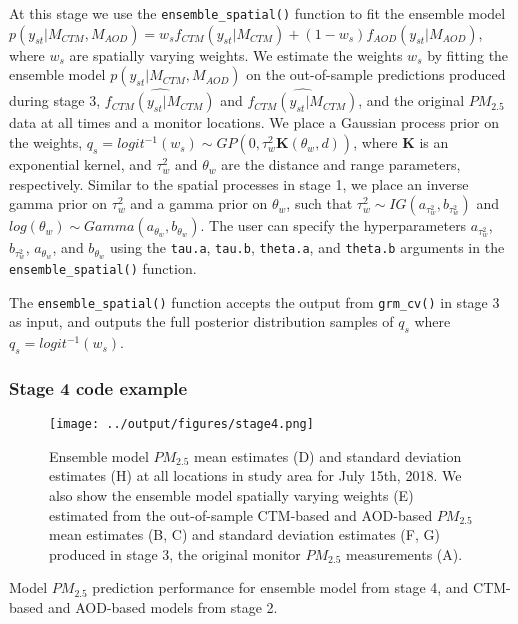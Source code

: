 \documentclass[12pt]{article}
\newcommand{\bl}{\mathbf}
\begin{document}
At this stage we use the \texttt{ensemble\_spatial()} function to fit the ensemble model  $p(y_{st} | M_{CTM}, M_{AOD}) = w_s f_{CTM}(y_{st} | M_{CTM}) + (1-w_s) f_{AOD}(y_{st}|M_{AOD})$, where $w_s$ are spatially varying weights.
We estimate the weights $w_s$ by fitting the ensemble model $p(y_{st} | M_{CTM}, M_{AOD})$ on the out-of-sample predictions produced during stage 3, $\widehat{f_{CTM}(y_{st} | M_{CTM})}$ and $\widehat{f_{CTM}(y_{st} | M_{CTM})}$, and the original $PM_{2.5}$ data at all times and a monitor locations.
We place a Gaussian process prior on the weights, $q_s = logit^{-1}(w_s) \sim GP(0, \tau^2_w  \bl{K}(\theta_w, d))$, where $\bl{K}$ is an exponential kernel, and $\tau^2_w$ and $\theta_w$ are the distance and range parameters, respectively.
Similar to the spatial processes in stage 1, we place an inverse gamma prior on $\tau^2_w$ and a gamma prior on $\theta_w$, such that $\tau^2_w \sim IG(a_{\tau^2_w}, b_{\tau^2_w})$ and $log(\theta_w) \sim Gamma(a_{\theta_w}, b_{\theta_w})$.
The user can specify the hyperparameters $a_{\tau^2_w}$, $b_{\tau^2_w}$, $a_{\theta_w}$, and $b_{\theta_w}$ using the \texttt{tau.a}, \texttt{tau.b}, \texttt{theta.a}, and \texttt{theta.b} arguments in the \texttt{ensemble\_spatial()} function.

The \texttt{ensemble\_spatial()} function accepts the output from \texttt{grm\_cv()} in stage 3 as input, and outputs the full posterior distribution samples of $q_s$ where $q_s = logit^{-1}(w_s)$. 

\subsubsection*{Stage 4 code example}

\begin{figure}[ht]
    \centering
    \texttt{[image: ../output/figures/stage4.png]}
    \caption{Ensemble model $PM_{2.5}$ mean estimates (D) and standard deviation estimates (H) at all locations in study area for July 15th, 2018. We also show the ensemble model spatially varying weights (E) estimated from the out-of-sample CTM-based and AOD-based $PM_{2.5}$ mean estimates (B, C) and standard deviation estimates (F, G) produced in stage 3, the original monitor $PM_{2.5}$ measurements (A).}
    \label{fig:stage4}
\end{figure}

\begin{table}[ht]
\centering
\caption{Model $PM_{2.5}$ prediction performance for ensemble model from stage 4, and CTM-based and AOD-based models from stage 2.}
\label{tab:modelcomparison}

\end{table}
\end{document}
